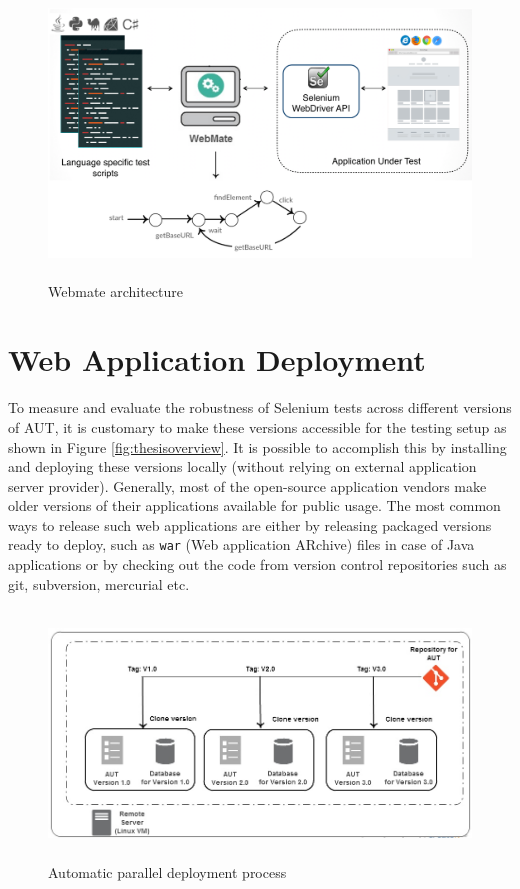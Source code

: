 \begin{figure}
\makeatletter 
\makeatother
    \centering
  \includegraphics[width=5.5in,height=3in]{./Figures/webmate-state-graph}
  \caption{Webmate architecture}
  \label{fig:webmateArchitecture} 
\end{figure}

\section{Web Application Deployment}
\label{sec:autoDeployment}
To measure and evaluate the robustness of Selenium tests across different versions of AUT, it is customary to make these versions accessible for the testing setup as shown in Figure \ref{fig:thesisoverview}. It is possible to accomplish this by installing and deploying these versions locally (without relying on external application server provider). Generally, most of the open-source application vendors make older versions of their applications available for public usage. The most common ways to release such web applications are either by releasing packaged versions ready to deploy, such as \texttt{war} (Web application ARchive) files in case of Java applications or by checking out the code from version control repositories such as git, subversion, mercurial etc.

\begin{figure}
\makeatletter 
\renewcommand{\thefigure}{\@arabic\c@figure}
\makeatother
    \centering
  \includegraphics[width=5.4in,height=2.6in]{./Figures/Deployment_Process_2.jpg}
  \caption{Automatic parallel deployment process}
  \label{fig:deployment} 
\end{figure}

